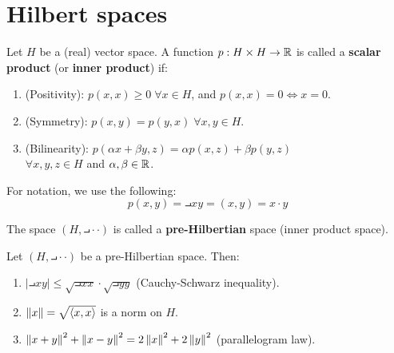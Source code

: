 \chapter{Hilbert spaces}

\begin{fdefinition}
    Let $H$ be a (real) vector space. A function $p: H \times H \to \mathbb{R}$ is called a 
    \textbf{scalar product} (or \textbf{inner product}) if:
    \vspace{1em}
    \begin{enumerate}[label=(\roman*)]
        \item (Positivity): $p(x, x) \geq 0 \; \forall x \in H$, and $p(x, x) = 0 \iff x = 0$.
        \vspace{1em}
        \item (Symmetry): $p(x, y) = p(y, x) \; \forall x, y \in H$.
        \vspace{1em}
        \item (Bilinearity): $p(\alpha x + \beta y, z) = \alpha p(x, z) + \beta p(y, z)$\\
        $\forall x, y, z \in H$ and $\alpha, \beta \in \mathbb{R}$.
    \end{enumerate}
\end{fdefinition}

\begin{note}
    For notation, we use the following:
    $$p(x, y) = \intprod{x}{y} = (x, y) = x \cdot y$$
\end{note}

\begin{fdefinition}
    The space $(H, \intprod{\cdot}{\cdot})$ is called a \textbf{pre-Hilbertian} space
    (inner product space).
\end{fdefinition}

\begin{fproposition}
    Let $(H, \intprod{\cdot}{\cdot})$ be a pre-Hilbertian space. Then:
    \vspace{1em}
    \begin{enumerate}[label=\arabic*)]
        \item $|\intprod{x}{y}| \leq \sqrt{\intprod{x}{x}} \cdot \sqrt{\intprod{y}{y}}$ (Cauchy-Schwarz inequality).
        \vspace{1em}
        \item $\left\|x\right\| = \sqrt{\left\langle x, x \right\rangle}$ is a norm on $H$.
        \vspace{1em}
        \item $\left\|x + y\right\|^2 + \left\|x - y\right\|^2 = 2 \left\|x\right\|^2 + 2 \left\|y\right\|^2$ (parallelogram law).
    \end{enumerate}
\end{fproposition}


